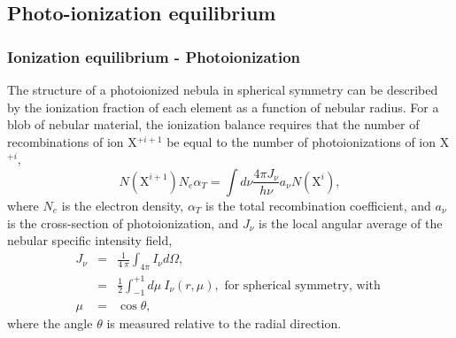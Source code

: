 \subsection{Photo-ionization equilibrium}
\begin{frame}\frametitle{Ionization equilibrium - Photoionization}

The structure of a photoionized nebula in spherical symmetry can be
described by the ionization fraction of each element as a function of
nebular radius. For a blob of nebular material, the ionization balance
requires that the number of recombinations of ion X$^{+i+1}$ be equal 
to the number of photoionizations of  ion X$^{+i}$,
\begin{equation}
N(\mathrm{X}^{i+1}) N_{e} \alpha_{T} = {\int}d{\nu} \frac{4\pi J_{\nu}}{h\nu}
a_{\nu} N(\mathrm{X}^{i}), 
\label{eq:ionisation_balance}
\end{equation}
where $N_{e}$ is the electron density, $\alpha_{T}$ is the total
recombination coefficient, and $a_{\nu}$ is the cross-section of
photoionization, and $J_{\nu}$ is the local angular average of the
nebular specific intensity field, 
\begin{eqnarray}
J_{\nu}  & =  & \frac{1}{4~\pi}\int_{4 \pi} I_\nu d\Omega , \nonumber \\
 & = & \frac{1}{2}\int_{-1}^{+1} d\mu ~I_\nu(r,\mu), \text{~for
 spherical symmetry, with } \nonumber  \\ 
\mu &  =  & \cos \theta, \nonumber
\end{eqnarray}
where the angle   $\theta$ is measured
 relative to the radial direction.

\end{frame}

